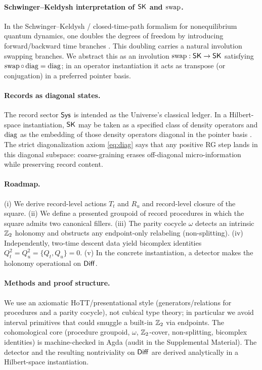 \documentclass[aps,prl,reprint,floatfix]{revtex4-2}
\theoremstyle{plain}
\theoremstyle{definition}
\begin{document}
\paragraph{Schwinger--Keldysh interpretation of $\mathsf{SK}$ and $\operatorname{swap}$.}
In the Schwinger--Keldysh / closed-time-path formalism for nonequilibrium quantum dynamics, one doubles the degrees of freedom by introducing forward/backward time branches \cite{Schwinger1961,Keldysh1965,Chou1985,Kamenev2011}.
This doubling carries a natural involution swapping branches.
We abstract this as an involution $\operatorname{swap}:\mathsf{SK}\to\mathsf{SK}$ satisfying $\operatorname{swap}\circ\operatorname{diag}=\operatorname{diag}$; in an operator instantiation it acts as transpose (or conjugation) in a preferred pointer basis.

\paragraph{Records as diagonal states.}
The record sector $\mathsf{Sys}$ is intended as the Universe’s classical ledger.
In a Hilbert-space instantiation, $\mathsf{SK}$ may be taken as a specified class of density operators and $\operatorname{diag}$ as the embedding of those density operators diagonal in the pointer basis \cite{Zurek1981PointerBasis,JoosZeh1985Emergence}.
The strict diagonalization axiom \eqref{eq:diag} says that any positive RG step lands in this diagonal subspace: coarse-graining erases off-diagonal micro-information while preserving record content.

\paragraph{Roadmap.}
(i) We derive record-level actions $T_t$ and $R_u$ and record-level closure of the square.
(ii) We define a presented groupoid of record procedures in which the square admits two canonical fillers.
(iii) The parity cocycle $\omega$ detects an intrinsic $\mathbb{Z}_2$ holonomy and obstructs any endpoint-only relabeling (non-splitting).
(iv) Independently, two-time descent data yield bicomplex identities $Q_t^2=Q_u^2=\{Q_t,Q_u\}=0$.
(v) In the concrete instantiation, a detector makes the holonomy operational on $\mathsf{Diff}$.

\paragraph{Methods and proof structure.}
We use an axiomatic HoTT/presentational style (generators/relations for procedures and a parity cocycle), not cubical type theory; in particular we avoid interval primitives that could smuggle a built-in $\mathbb{Z}_2$ via endpoints.
The cohomological core (procedure groupoid, $\omega$, $\mathbb{Z}_2$-cover, non-splitting, bicomplex identities) is machine-checked in Agda (audit in the Supplemental Material).
The detector and the resulting nontriviality on $\mathsf{Diff}$ are derived analytically in a Hilbert-space instantiation.
\end{document}
